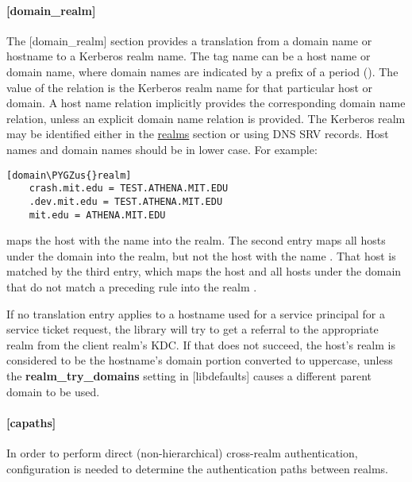 \documentclass[letterpaper,10pt,english]{sphinxmanual}
\def\PYGZus{\char`\_}
\begin{document}
\paragraph{{[}domain\_realm{]}}
\label{admin/conf_files/krb5_conf:id3}\label{admin/conf_files/krb5_conf:domain-realm}
The {[}domain\_realm{]} section provides a translation from a domain name
or hostname to a Kerberos realm name.  The tag name can be a host name
or domain name, where domain names are indicated by a prefix of a
period ().  The value of the relation is the Kerberos realm name
for that particular host or domain.  A host name relation implicitly
provides the corresponding domain name relation, unless an explicit domain
name relation is provided.  The Kerberos realm may be
identified either in the {\hyperref[admin/conf_files/krb5_conf:realms]{realms}} section or using DNS SRV records.
Host names and domain names should be in lower case.  For example:

\begin{Verbatim}[commandchars=\\\{\}]
[domain\PYGZus{}realm]
    crash.mit.edu = TEST.ATHENA.MIT.EDU
    .dev.mit.edu = TEST.ATHENA.MIT.EDU
    mit.edu = ATHENA.MIT.EDU
\end{Verbatim}

maps the host with the name  into the
 realm.  The second entry maps all hosts under the
domain  into the  realm, but not
the host with the name .  That host is matched
by the third entry, which maps the host  and all hosts
under the domain  that do not match a preceding rule
into the realm .

If no translation entry applies to a hostname used for a service
principal for a service ticket request, the library will try to get a
referral to the appropriate realm from the client realm's KDC.  If
that does not succeed, the host's realm is considered to be the
hostname's domain portion converted to uppercase, unless the
\textbf{realm\_try\_domains} setting in {[}libdefaults{]} causes a different
parent domain to be used.


\paragraph{{[}capaths{]}}
\label{admin/conf_files/krb5_conf:id4}\label{admin/conf_files/krb5_conf:capaths}
In order to perform direct (non-hierarchical) cross-realm
authentication, configuration is needed to determine the
authentication paths between realms.
\end{document}
